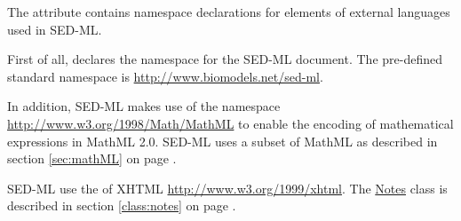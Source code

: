 \label{sec:xmlns}
The  attribute contains namespace declarations for elements of external languages used in SED-ML.

First of all,  declares the namespace for the SED-ML document. The pre-defined standard namespace is \url{http://www.biomodels.net/sed-ml}. 

In addition, SED-ML makes use of the  namespace \url{http://www.w3.org/1998/Math/MathML} to enable the encoding of mathematical expressions in MathML 2.0. SED-ML uses a subset of MathML as described in section \ref{sec:mathML} on page \pageref{sec:mathML}.

SED-ML  use the  of XHTML \url{http://www.w3.org/1999/xhtml}.  The \hyperref[class:notes]{Notes} class is described in section \ref{class:notes} on page \pageref{class:notes}.


